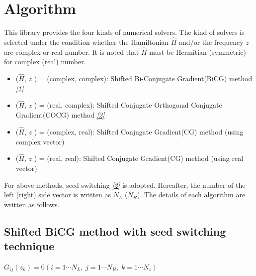 \documentclass[letterpaper,10pt,dvipdfmx,openany]{sphinxmanual}
\begin{document}
\chapter{Algorithm}
\label{komega_algorithm_en::doc}\label{komega_algorithm_en:algorithm}
This library provides the four kinds of numerical solvers.
The kind of solvers is selected under the condition whether the Hamiltonian
\({\hat H}\) and/or the frequency \(z\) are complex or real number.
It is noted that \({\hat H}\) must be Hermitian (symmetric)
for complex (real) number.
\begin{itemize}
\item {} 
(\({\hat H}\), \(z\) ) = (complex, complex):
Shifted Bi-Conjugate Gradient(BiCG) method {\hyperref[komega_ref_en:ref]{\emph{{[}1{]}}}}

\item {} 
(\({\hat H}\), \(z\) ) = (real, complex):
Shifted Conjugate Orthogonal Conjugate Gradient(COCG) method {\hyperref[komega_ref_en:ref]{\emph{{[}2{]}}}}

\item {} 
(\({\hat H}\), \(z\) ) = (complex, real):
Shifted Conjugate Gradient(CG) method (using complex vector)

\item {} 
(\({\hat H}\), \(z\) ) = (real, real):
Shifted Conjugate Gradient(CG) method (using real vector)

\end{itemize}

For above methods, seed switching {\hyperref[komega_ref_en:ref]{\emph{{[}2{]}}}} is adopted.
Hereafter, the number of the left (right) side vector is
written as \(N_L\) (\(N_R\)).
The details of each algorithm are written as follows.


\section{Shifted BiCG method with seed switching technique}
\label{komega_algorithm_en:shifted-bicg-method-with-seed-switching-technique}
\(G_{i j}(z_k) = 0 (i=1 \cdots N_L,\; j = 1 \cdots N_R,\; k=1 \cdots N_z)\)
\end{document}
